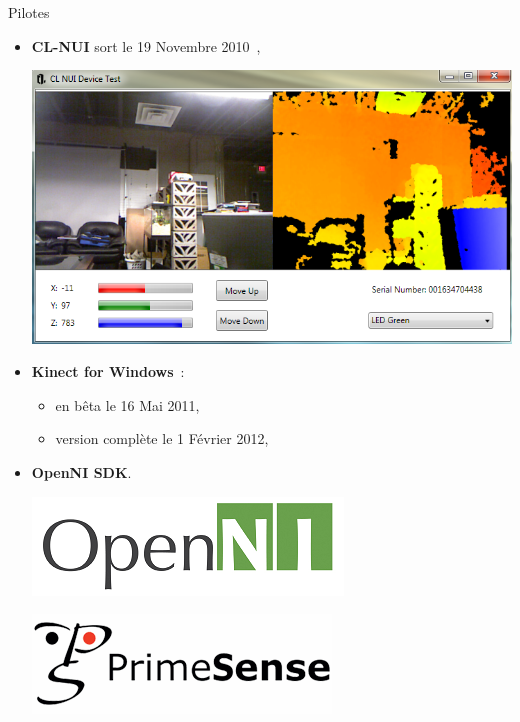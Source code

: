 \begin{frame}{Pilotes}
{\begin{itemize}
    \item<3-> \textbf{CL-NUI} sort le 19 Novembre 2010~\cite{clnui},
    
    {
    \vfill
    \begin{center}
    \includegraphics[width=0.6\linewidth]{../images/clnui}
    \end{center}
    }
    
    \item<4-> \textbf{Kinect for Windows}~:
  {
    \begin{itemize}
      \item en bêta le 16 Mai 2011,
      \item version complète le 1 Février 2012,
    \end{itemize}
  }
  \item<5-> \textbf{OpenNI SDK}.
  
  {
  \begin{minipage}{0.49\linewidth}
    \centering
    \includegraphics[width=0.9\linewidth]{../images/openni_logo}
  \end{minipage}
  \begin{minipage}{0.49\linewidth}
    \centering
    \includegraphics[width=0.9\linewidth]{../images/primesense_logo}
  \end{minipage}
  }
  
  \end{itemize}
\vfill
}
\end{frame}

